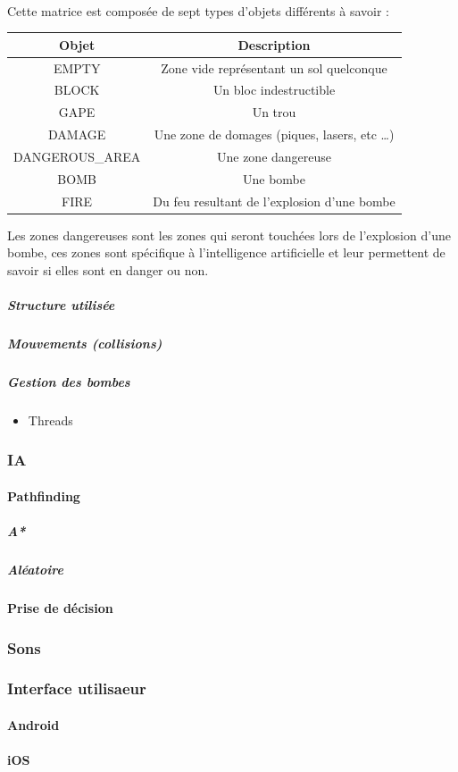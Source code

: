 			$\,$
			
			Cette matrice est composée de sept types d'objets différents à savoir :
			
			\begin{center}
				\begin{tabular}{|c|c|} \hline
				Objet  & Description \\\hline
				EMPTY  & Zone vide représentant un sol quelconque\\\hline
				BLOCK  & Un bloc indestructible\\\hline
				GAPE   & Un trou \\\hline
				DAMAGE & Une zone de domages (piques, lasers, etc \ldots) \\\hline
				DANGEROUS\_AREA & Une zone dangereuse\\\hline
				BOMB & Une bombe\\\hline
				FIRE & Du feu resultant de l'explosion d'une bombe\\\hline
				\end{tabular}
			\end{center}
			
			Les zones dangereuses sont les zones qui seront touchées lors de l'explosion
			d'une bombe, ces zones sont spécifique à l'intelligence artificielle et leur
			permettent de savoir si elles sont en danger ou non.
		
			\subparagraph{Structure utilisée}
			\subparagraph{Mouvements (collisions)}
			\subparagraph{Gestion des bombes}
				\begin{itemize}
					\item{Threads}
				\end{itemize}
	
	\subsubsection{IA}
	
		\hypertarget{IA}{}
		\label{IA}
		
		\paragraph{Pathfinding}
			\subparagraph{A*}
			\subparagraph{Aléatoire}
			\paragraph{Prise de décision}
			

	\subsubsection{Sons}
	
		\hypertarget{Sons}{}
		\label{Sons}
	
	\subsubsection{Interface utilisaeur}
		\paragraph{Android}
		\paragraph{iOS}